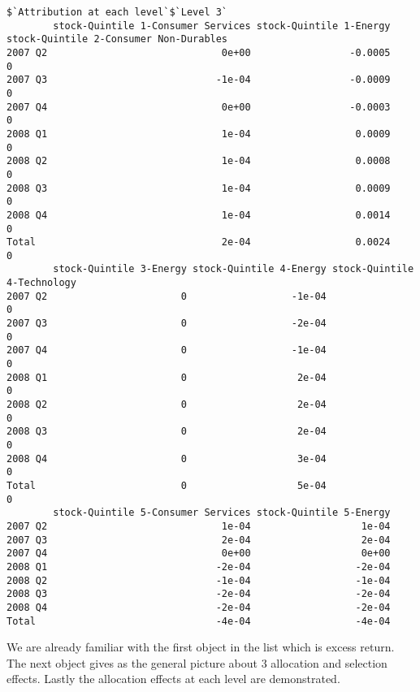 \documentclass[11pt,a4paper]{article}
\begin{document}
\begin{verbatim}
$`Attribution at each level`$`Level 3`
        stock-Quintile 1-Consumer Services stock-Quintile 1-Energy stock-Quintile 2-Consumer Non-Durables
2007 Q2                              0e+00                 -0.0005                                      0
2007 Q3                             -1e-04                 -0.0009                                      0
2007 Q4                              0e+00                 -0.0003                                      0
2008 Q1                              1e-04                  0.0009                                      0
2008 Q2                              1e-04                  0.0008                                      0
2008 Q3                              1e-04                  0.0009                                      0
2008 Q4                              1e-04                  0.0014                                      0
Total                                2e-04                  0.0024                                      0
        stock-Quintile 3-Energy stock-Quintile 4-Energy stock-Quintile 4-Technology
2007 Q2                       0                  -1e-04                           0
2007 Q3                       0                  -2e-04                           0
2007 Q4                       0                  -1e-04                           0
2008 Q1                       0                   2e-04                           0
2008 Q2                       0                   2e-04                           0
2008 Q3                       0                   2e-04                           0
2008 Q4                       0                   3e-04                           0
Total                         0                   5e-04                           0
        stock-Quintile 5-Consumer Services stock-Quintile 5-Energy
2007 Q2                              1e-04                   1e-04
2007 Q3                              2e-04                   2e-04
2007 Q4                              0e+00                   0e+00
2008 Q1                             -2e-04                  -2e-04
2008 Q2                             -1e-04                  -1e-04
2008 Q3                             -2e-04                  -2e-04
2008 Q4                             -2e-04                  -2e-04
Total                               -4e-04                  -4e-04

\end{verbatim}
\endgroup

We are already familiar with the first object in the list which is excess return. The next object gives as the general picture about 3 allocation and selection effects. Lastly the allocation effects at each level are demonstrated.
\end{document}
